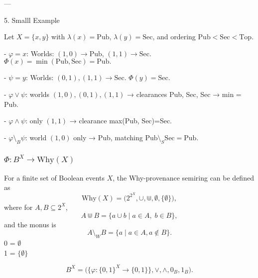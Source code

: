---

 5. Smalll Example

Let \(X=\{x,y\}\) with \(\lambda(x)=\mathrm{Pub}\), \(\lambda(y)=\mathrm{Sec}\),
and ordering \(\mathrm{Pub}<\mathrm{Sec}<\mathrm{Top}\).

- \(\varphi = x\):  
  Worlds: \((1,0)\to\mathrm{Pub}\), \((1,1)\to\mathrm{Sec}\).  
  \(\Phi(x)=\min(\mathrm{Pub},\mathrm{Sec})=\mathrm{Pub}.\)

- \(\psi = y\):  
  Worlds: \((0,1),(1,1)\to\mathrm{Sec}\).  
  \(\Phi(y)=\mathrm{Sec}.\)

- \(\varphi\vee\psi\): worlds \((1,0),(0,1),(1,1)\) → clearances Pub, Sec, Sec → min = Pub.

- \(\varphi\wedge\psi\): only \((1,1)\) → clearance max(Pub, Sec)=Sec.

- \(\varphi\setminus_B\psi\): world \((1,0)\) only → Pub, matching \(\mathrm{Pub}\setminus_S\mathrm{Sec}=\mathrm{Pub}.\)


\subsubsection{\(\Phi : B^X \to \mathrm{Why}(X)\)}

For a finite set of Boolean events \(X\), the Why-provenance semiring can be defined as
\[
\mathrm{Why}(X) = \bigl(2^{2^X},\cup,\Cup,\emptyset,\{\emptyset\}\bigr),
\]
where for \(A,B\subseteq 2^X\),
\[
A \Cup B = \{a \cup b \mid a\in A,\;b\in B\},
\]
and the monus is
\[
A \setminus_W B = \{ a \mid a \in A,  a \notin B \}.
\]
0 = \(\emptyset\)\\  
1 = \(\{\emptyset\}\)




 
\[
B^X = \bigl(\{\varphi:\{0,1\}^X\to\{0,1\}\},\vee,\wedge,0_B,1_B\bigr).
\]

